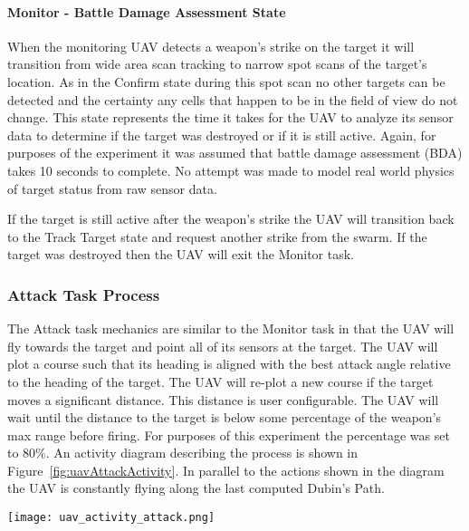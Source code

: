 \paragraph{Monitor - Battle Damage Assessment State}
When the monitoring UAV detects a weapon's strike on the target it will transition from wide area scan tracking to narrow spot scans of the target's location.  As in the Confirm state during this spot scan no other targets can be detected and the certainty any cells that happen to be in the field of view do not change.  This state represents the time it takes for the UAV to analyze its sensor data to determine if the target was destroyed or if it is still active.  Again, for purposes of the experiment it was assumed that battle damage assessment (BDA) takes 10 seconds to complete.  No attempt was made to model real world physics of target status from raw sensor data.

If the target is still active after the weapon's strike the UAV will transition back to the Track Target state and request another strike from the swarm.  If the target was destroyed then the UAV will exit the Monitor task.


\subsubsection{Attack Task Process}
The Attack task mechanics are similar to the Monitor task in that the UAV will fly towards the target and point all of its sensors at the target.  The UAV will plot a course such that its heading is aligned with the best attack angle relative to the heading of the target.  The UAV will re-plot a new course if the target moves a significant distance.  This distance is user configurable.  The UAV will wait until the distance to the target is below some percentage of the weapon's max range before firing.  For purposes of this experiment the percentage was set to 80\%.  An activity diagram describing the process is shown in Figure~\ref{fig:uavAttackActivity}.  In parallel to the actions shown in the diagram the UAV is constantly flying along the last computed Dubin's Path.

\begin{figure*}%
	\centering
	\texttt{[image: uav\_activity\_attack.png]}
	\caption{UAV Attack Activity}
	\label{fig:uavAttackActivity}
\end{figure*}


